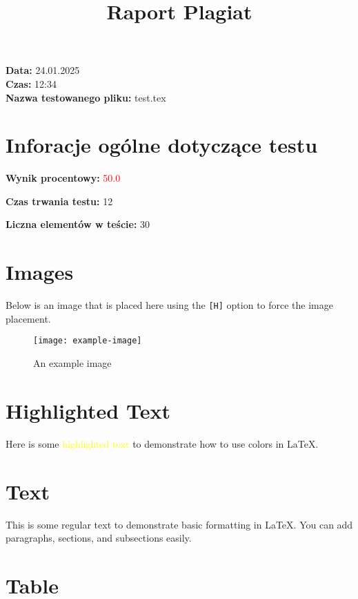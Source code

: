 \documentclass{article}
\title{Raport Plagiat}
\date{}
\begin{document}
\maketitle

\begin{center}
    \textbf{Data:} 24.01.2025 \\
    \textbf{Czas:} 12:34 \\
    \textbf{Nazwa testowanego pliku:} test.tex
\end{center}

\section{Inforacje ogólne dotyczące testu}

\textbf{Wynik procentowy:} \textcolor{red}{ 50.0 }

\textbf{Czas trwania testu:} 12

\textbf{Liczna elementów w teście:} 30


\section{Images}

Below is an image that is placed here using the \texttt{[H]} option to force the image placement.

\begin{figure}[H]
\centering
\texttt{[image: example-image]} %
\caption{An example image}
\end{figure}

\section{Highlighted Text}

Here is some \textcolor{yellow}{highlighted text} to demonstrate how to use colors in LaTeX.

\section{Text}

This is some regular text to demonstrate basic formatting in LaTeX. You can add paragraphs, sections, and subsections easily.

\section{Table}
\end{document}
